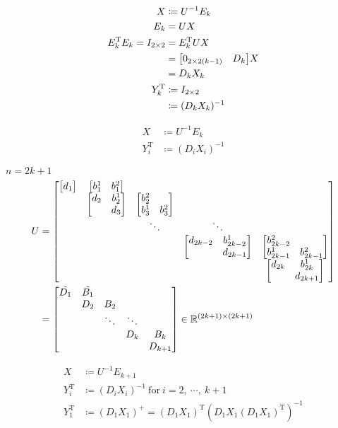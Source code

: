 \documentclass[11pt]{article}
\newcommand{\T}{\mathrm{T}}
\begin{document}
\begin{align*}
    X &\coloneqq U^{-1} E_k\\
    E_{k} &= U X \\
    E_{k}^{\T} E_{k} = I_{2 \times 2} &= E_{k}^{\T} U X \\
        &= \mqty[
            0_{2 \times 2(k-1)} & D_{k}
        ] X \\
        &= D_{k} X_{k} \\
    Y_{k}^{\T} &\coloneqq I_{2 \times 2} \\
        &\coloneqq (D_{k} X_{k})^{-1}
\end{align*}

\begin{align*}
    X &\coloneqq U^{-1} E_{k} \\
    Y_{i}^{\T} &\coloneqq (D_{i} X_{i})^{-1}
\end{align*}









\newpage
$n = 2k + 1$
\begin{align*}
    U &= \mqty[
        \mqty[d_{1}] & \mqty[b^{1}_{1} & b^{2}_{1}] &   &   &  \\
          & \mqty[d_{2} & b^{1}_{2} \\ & d_{3}] & \mqty[b^{2}_{2} & \\ b^{1}_{3} & b^{2}_{3}] &   &  \\
          &   & \ddots & \ddots &  \\
          &   &   & \mqty[d_{2k-2} & b^{1}_{2k-2} \\ & d_{2k-1}] & \mqty[b^{2}_{2k-2} & \\ b^{1}_{2k-1} & b^{2}_{2k-1}] \\
          &   &   &   & \mqty[d_{2k} & b^{1}_{2k}\\ & d_{2k+1}]
    ]\\
    &= \mqty[
        \tilde{D_{1}} & \tilde{B_{1}} &   &   &  \\
          & D_{2} & B_{2} &   &  \\
          &   & \ddots & \ddots &  \\
          &   &   & D_{k} & B_{k}\\
          &   &   &   & D_{k+1}
    ] \in \mathbb{R}^{(2k+1) \times (2k+1)}
\end{align*}


\begin{align*}
    X &\coloneqq U^{-1} E_{k+1} \\
    Y_{i}^{\T} &\coloneqq (D_{i} X_{i})^{-1} \ \text{for}\ i = 2,\ \cdots,\ k+1 \\
    Y_{1}^{\T} &\coloneqq (D_{1} X_{1})^{+} = (D_{1} X_{1})^{\T} (D_{1} X_{1} (D_{1} X_{1})^{\T})^{-1}
\end{align*}
\end{document}
